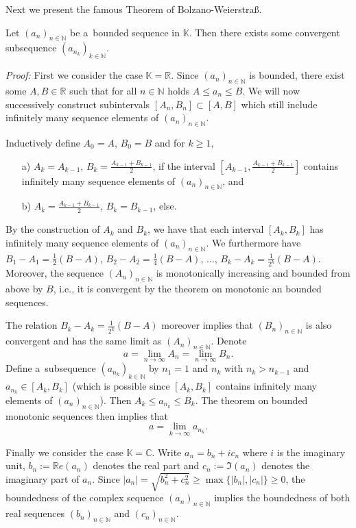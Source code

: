 

Next we present the famous Theorem of Bolzano-Weierstra\ss. 
\begin{Theorem}\label{thm:bzr}
Let $(a_n)_{n\in\mathbb{N}}$ be a~bounded sequence in $\mathbb{K}$. Then there exists some convergent subsequence $(a_{n_k})_{k\in\mathbb{N}}$.
\end{Theorem}
{\em Proof:} First we consider the case $\mathbb{K}=\mathbb{R}$. 
Since $(a_n)_{n\in\mathbb{N}}$ is bounded, there exist some $A,B\in\mathbb{R}$ such that for all $n\in\mathbb{N}$ holds $A\leq a_n\leq B$. 
We will now successively construct subintervals $[A_n,B_n]\subset[A,B]$ which still include infinitely many sequence elements of $(a_n)_{n\in\mathbb{N}}$.

Inductively define $A_0=A$, $B_0=B$ and for $k\geq1$,
\begin{itemize}
 \item[a)] $A_k=A_{k-1}$, $B_k=\frac{A_{k-1}+B_{k-1}}2$, if the interval $[A_{k-1},\frac{A_{k-1}+B_{k-1}}2]$ contains
           infinitely many sequence elements of $(a_n)_{n\in\mathbb{N}}$, and
 \item[b)] $A_k=\frac{A_{k-1}+B_{k-1}}2$, $B_k=B_{k-1}$, else.
\end{itemize}
By the construction of $A_k$ and $B_k$, we have that each interval $[A_k,B_k]$ has infinitely many sequence elements of $(a_n)_{n\in\mathbb{N}}$. 
We furthermore have $B_1-A_1=\frac12(B-A)$, $B_2-A_2=\frac14(B-A)$, $\ldots$, $B_k-A_k=\frac1{2^k}(B-A)$. 
Moreover, the sequence $(A_n)_{n\in\mathbb{N}}$ is monotonically increasing and bounded from above by $B$, i.e., it is convergent by
the theorem on monotonic an bounded sequences. 

The relation $B_k-A_k=\frac1{2^k}(B-A)$ moreover implies that $(B_n)_{n\in\mathbb{N}}$ is also convergent and has 
the same limit as $(A_n)_{n\in\mathbb{N}}$. Denote
\[a=\lim_{n\to\infty}A_{n}=\lim_{n\to\infty}B_{n}.\]
Define a~subsequence $(a_{n_k})_{k\in\mathbb{N}}$ by $n_1=1$ and $n_k$ with $n_k>n_{k-1}$ and $a_{n_k}\in[A_k,B_k]$ 
(which is possible since $[A_k,B_k]$ contains infinitely many elements of $(a_{n})_{n\in\mathbb{N}}$).
Then $A_k\leq a_{n_k}\leq B_k$. The theorem on bounded monotonic sequences then implies that
\[a=\lim_{k\to\infty}a_{n_k}.\]

Finally we consider the case $\mathbb{K}=\mathbb{C}$. Write $a_n=b_n+ic_n$ where $i$ is the imaginary unit, 
$b_n:=\mathbb{R}e(a_n)$ denotes the real part and $c_n:={\Im}(a_n)$ denotes the imaginary part of $a_n$. 
Since $|a_n|=\sqrt{b_n^2+c_n^2}\geq \max\{|b_n|,|c_n|\}\geq 0$, the boundedness of the complex sequence $(a_n)_{n\in\mathbb{N}}$ implies
the boundedness of both real sequences $(b_n)_{n\in\mathbb{N}}$ and $(c_n)_{n\in\mathbb{N}}$. 

